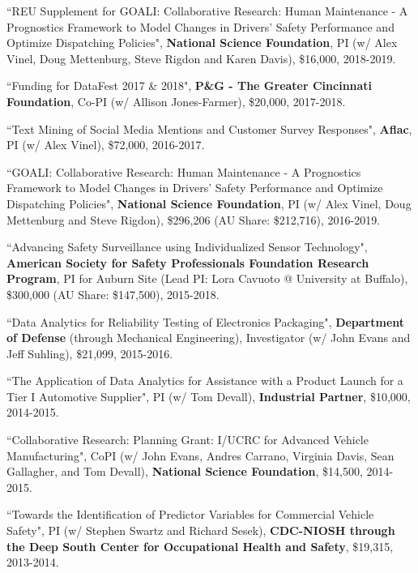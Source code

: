 \documentclass[margin,line]{res}
\begin{document}
\begin{resume}
\vspace{-1.5mm}
``REU Supplement for GOALI: Collaborative Research: Human Maintenance - A Prognostics Framework to Model Changes in Drivers' Safety Performance and Optimize Dispatching Policies", \textbf{National Science Foundation}, PI (w/ Alex Vinel, Doug Mettenburg, Steve Rigdon and Karen Davis), \$16,000, 2018-2019.

\vspace{-1.5mm}
``Funding for DataFest 2017 \& 2018", \textbf{P\&G - The Greater Cincinnati Foundation}, Co-PI (w/ Allison Jones-Farmer), \$20,000, 2017-2018.

\vspace{-1.5mm}
``Text Mining of Social Media Mentions and Customer Survey Responses", \textbf{Aflac}, PI (w/ Alex Vinel), \$72,000, 2016-2017.

\vspace{-1.5mm}
``GOALI: Collaborative Research: Human Maintenance - A Prognostics Framework to Model Changes in Drivers' Safety Performance and Optimize Dispatching Policies", \textbf{National Science Foundation}, PI (w/ Alex Vinel, Doug Mettenburg and Steve Rigdon), \$296,206 (AU Share: \$212,716), 2016-2019.

\vspace{-1.5mm}
``Advancing Safety Surveillance using Individualized Sensor Technology", \textbf{American Society for Safety Professionals Foundation Research Program}, PI for Auburn Site (Lead PI: Lora Cavuoto @ University at Buffalo), \$300,000 (AU Share: \$147,500), 2015-2018.

\vspace{-1.5mm}
``Data Analytics for Reliability Testing of Electronics Packaging", \textbf{Department of Defense} (through Mechanical Engineering), Investigator (w/ John Evans and Jeff Suhling), \$21,099, 2015-2016.

\vspace{-1.5mm}
``The Application of Data Analytics for Assistance with a Product Launch for a Tier I Automotive Supplier", PI (w/ Tom Devall), \textbf{Industrial Partner}, \$10,000, 2014-2015.

\vspace{-1.5mm}
``Collaborative Research: Planning Grant: I/UCRC for Advanced Vehicle Manufacturing", CoPI (w/ John Evans, Andres Carrano, Virginia Davis, Sean Gallagher, and Tom Devall), \textbf{National Science Foundation}, \$14,500, 2014-2015.

\vspace{-1.5mm}
``Towards the Identification of Predictor Variables for Commercial Vehicle Safety", PI (w/ Stephen Swartz and Richard Sesek), \textbf{CDC-NIOSH through the Deep South Center for Occupational Health and Safety}, \$19,315, 2013-2014.


\end{resume}
\end{document}

